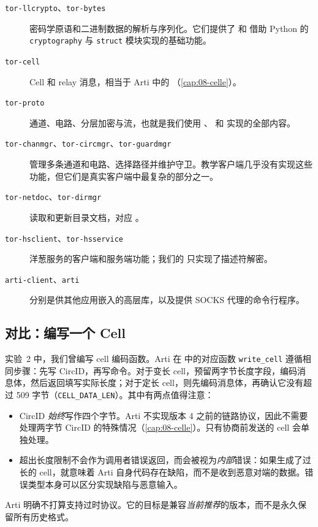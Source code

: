 \begin{description}
  \item[\texttt{tor-llcrypto}、\texttt{tor-bytes}] 密码学原语和二进制数据的解析与序列化。它们提供了  和  借助 Python 的 \texttt{cryptography} 与 \texttt{struct} 模块实现的基础功能。
  \item[\texttt{tor-cell}] Cell 和 relay 消息，相当于 Arti 中的 （\cref{cap:08-celle}）。
  \item[\texttt{tor-proto}] 通道、电路、分层加密与流，也就是我们使用 、 和  实现的全部内容。
  \item[\texttt{tor-chanmgr}、\texttt{tor-circmgr}、\texttt{tor-guardmgr}] 管理多条通道和电路、选择路径并维护守卫。教学客户端几乎没有实现这些功能，但它们是真实客户端中最复杂的部分之一。
  \item[\texttt{tor-netdoc}、\texttt{tor-dirmgr}] 读取和更新目录文档，对应 。
  \item[\texttt{tor-hsclient}、\texttt{tor-hsservice}] 洋葱服务的客户端和服务端功能；我们的  只实现了描述符解密。
  \item[\texttt{arti-client}、\texttt{arti}] 分别是供其他应用嵌入的高层库，以及提供 SOCKS 代理的命令行程序。
\end{description}

\subsection{对比：编写一个 Cell}

实验~2 中，我们曾编写 cell 编码函数。Arti 在  中的对应函数 \texttt{write\_cell} 遵循相同步骤：先写 CircID，再写命令。对于变长 cell，预留两字节长度字段，编码消息体，然后返回填写实际长度；对于定长 cell，则先编码消息体，再确认它没有超过 509 字节（\texttt{CELL\_DATA\_LEN}）。其中有两点值得注意：
\begin{itemize}
  \item CircID \emph{始终}写作四个字节。Arti 不实现版本 4 之前的链路协议，因此不需要处理两字节 CircID 的特殊情况（\cref{cap:08-celle}）。只有协商前发送的  cell 会单独处理。
  \item 超出长度限制不会作为调用者错误返回，而会被视为\emph{内部}错误：如果生成了过长的 cell，就意味着 Arti 自身代码存在缺陷，而不是收到恶意对端的数据。错误类型本身可以区分实现缺陷与恶意输入。
\end{itemize}
Arti 明确不打算支持过时协议。它的目标是兼容\emph{当前推荐}的版本，而不是永久保留所有历史格式。

